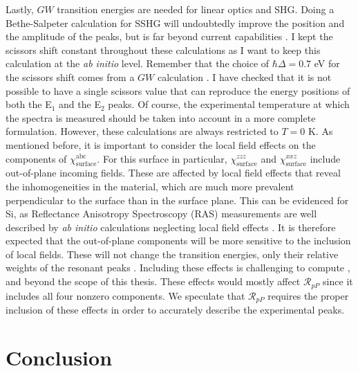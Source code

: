 {\color{red}
Lastly, $GW$ transition energies are needed for linear optics and SHG. Doing a
Bethe-Salpeter calculation for SSHG will undoubtedly improve the position and
the amplitude of the peaks, but is far beyond current capabilities \cite{puff}.
I kept the scissors shift constant throughout these calculations as I want to
keep this calculation at the {\em ab initio} level. Remember that the choice of
$\hbar\Delta=0.7$ eV for the scissors shift comes from a $GW$ calculation
\cite{liPRB10}. I have checked that it is not possible to have a single scissors
value that can reproduce the energy positions of both the E$_{1}$ and the
E$_{2}$ peaks. Of course, the experimental temperature at which the spectra is
measured should be taken into account in a more complete formulation. However,
these calculations are always restricted to $T=0$ K. As mentioned before, it is
important to consider the local field effects on the components of
$\chi^{\mathrm{abc}}_{\mathrm{surface}}$. For this surface in particular,
$\chi^{zzz}_{\mathrm{surface}}$ and $\chi^{xxz}_{\mathrm{surface}}$ include
out-of-plane incoming fields. These are affected by local field effects
\cite{tancognedejean:tel-01235611} that reveal the inhomogeneities in the
material, which are much more prevalent perpendicular to the surface than in the
surface plane. This can be evidenced for Si, as Reflectance Anisotropy
Spectroscopy (RAS) measurements are well described by \emph{ab initio}
calculations neglecting local field effects \cite{palummoPRB99, gaalPRB09}. It
is therefore expected that the out-of-plane components will be more sensitive to
the inclusion of local fields. These will not change the transition energies,
only their relative weights of the resonant peaks
\cite{tancognedejean:tel-01235611}. Including these effects is challenging to
compute \cite{nicolasPRB15}, and beyond the scope of this thesis. These effects
would mostly affect $\mathcal{R}_{pP}$ since it includes all four nonzero
components. We speculate that $\mathcal{R}_{pP}$ requires the proper inclusion
of these effects in order to accurately describe the experimental peaks.
}



\section{Conclusion}

